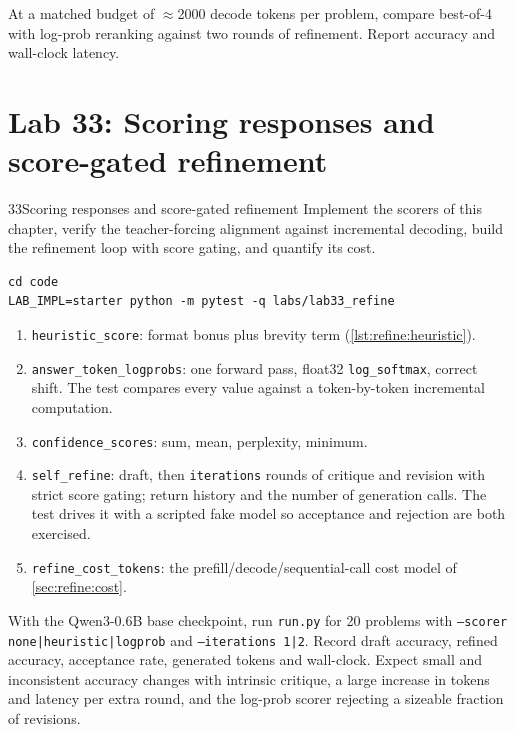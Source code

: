 \begin{exercise}
At a matched budget of $\approx$2000 decode tokens per problem, compare best-of-4 with log-prob
reranking against two rounds of refinement. Report accuracy and wall-clock latency.
\end{exercise}

\section{Lab 33: Scoring responses and score-gated refinement}\label{sec:refine:lab}

\begin{labbox}{33}{Scoring responses and score-gated refinement}
Implement the scorers of this chapter, verify the teacher-forcing alignment against incremental
decoding, build the refinement loop with score gating, and quantify its cost.

\begin{lstlisting}[style=shell]
cd code
LAB_IMPL=starter python -m pytest -q labs/lab33_refine
\end{lstlisting}

\begin{enumerate}
  \item \texttt{heuristic\_score}: format bonus plus brevity term (\cref{lst:refine:heuristic}).
  \item \texttt{answer\_token\_logprobs}: one forward pass, float32 \texttt{log\_softmax}, correct
  shift. The test compares every value against a token-by-token incremental computation.
  \item \texttt{confidence\_scores}: sum, mean, perplexity, minimum.
  \item \texttt{self\_refine}: draft, then \texttt{iterations} rounds of critique and revision with
  strict score gating; return history and the number of generation calls. The test drives it with a
  scripted fake model so acceptance and rejection are both exercised.
  \item \texttt{refine\_cost\_tokens}: the prefill/decode/sequential-call cost model of
  \cref{sec:refine:cost}.
\end{enumerate}

With the Qwen3-0.6B base checkpoint, run \texttt{run.py} for 20 problems with
\texttt{--scorer none|heuristic|logprob} and \texttt{--iterations 1|2}. Record draft accuracy,
refined accuracy, acceptance rate, generated tokens and wall-clock. Expect small and inconsistent
accuracy changes with intrinsic critique, a large increase in tokens and latency per extra round, and
the log-prob scorer rejecting a sizeable fraction of revisions.


\end{labbox}
